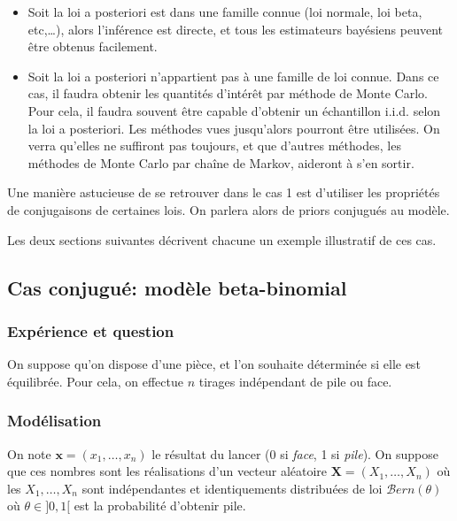 \documentclass[]{article}
\providecommand{\tightlist}{%
  \setlength{\itemsep}{0pt}\setlength{\parskip}{0pt}}
\begin{document}
\begin{itemize}
\tightlist
\item
  Soit la loi a posteriori est dans une famille connue (loi normale, loi
  beta, etc,\ldots{}), alors l'inférence est directe, et tous les
  estimateurs bayésiens peuvent être obtenus facilement.
\item
  Soit la loi a posteriori n'appartient pas à une famille de loi connue.
  Dans ce cas, il faudra obtenir les quantités d'intérêt par méthode de
  Monte Carlo. Pour cela, il faudra souvent être capable d'obtenir un
  échantillon i.i.d. selon la loi a posteriori. Les méthodes vues
  jusqu'alors pourront être utilisées. On verra qu'elles ne suffiront
  pas toujours, et que d'autres méthodes, les méthodes de Monte Carlo
  par chaîne de Markov, aideront à s'en sortir.
\end{itemize}

Une manière astucieuse de se retrouver dans le cas 1 est d'utiliser les
propriétés de conjugaisons de certaines lois. On parlera alors de priors
conjugués au modèle.

Les deux sections suivantes décrivent chacune un exemple illustratif de
ces cas.

\hypertarget{cas-conjuguuxe9-moduxe8le-beta-binomial}{%
\subsection{Cas conjugué: modèle
beta-binomial}\label{cas-conjuguuxe9-moduxe8le-beta-binomial}}

\hypertarget{expuxe9rience-et-question}{%
\subsubsection{Expérience et question}\label{expuxe9rience-et-question}}

On suppose qu'on dispose d'une pièce, et l'on souhaite déterminée si
elle est équilibrée. Pour cela, on effectue \(n\) tirages indépendant de
pile ou face.

\hypertarget{moduxe9lisation}{%
\subsubsection{Modélisation}\label{moduxe9lisation}}

On note \(\mathbf{x} = (x_1, \dots, x_n)\) le résultat du lancer (0 si
\emph{face}, 1 si \emph{pile}). On suppose que ces nombres sont les
réalisations d'un vecteur aléatoire \(\mathbf{X} = (X_1,\dots,X_{n})\)
où les \(X_1, \dots, X_n\) sont indépendantes et identiquements
distribuées de loi \(\mathcal{B}ern(\theta)\) où \(\theta \in ]0, 1[\)
est la probabilité d'obtenir pile.
\end{document}
